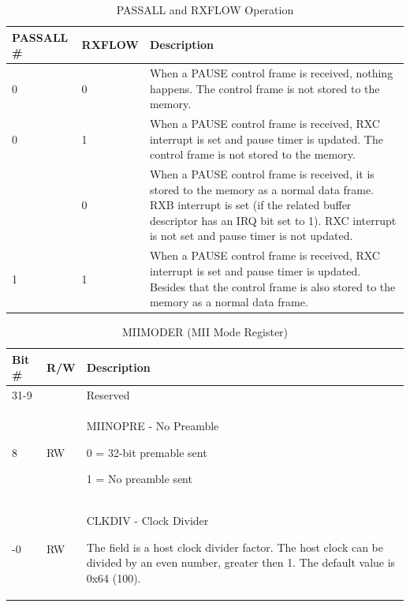 \begin{xltabular}{\textwidth}{|l|l|X|}
  
  \hline
  {\bf PASSALL \#} & {\bf RXFLOW} & {\bf Description} \\ \hline
  \endfirsthead
  \hline
  \caption{PASSALL and RXFLOW Operation}
  \endlastfoot

  0   & 0 &   When a PAUSE control frame is received, nothing happens. The
              control frame is not stored to the memory.\\* \nobreakhline
  0   & 1 &   When a PAUSE control frame is received, RXC interrupt is set
              and pause timer is updated. The control frame is not stored to
              the memory.\\*    & 0 &   When a PAUSE control frame is received, it is stored to the
              memory as a normal data frame. RXB interrupt is set (if the
              related buffer descriptor has an IRQ bit set to 1). RXC
              interrupt is not set and pause timer is not updated.\\* \nobreakhline
  1   & 1 &   When a PAUSE control frame is received, RXC interrupt is set
              and pause timer is updated. Besides that the control frame is
              also stored to the memory as a normal data frame.\\ \hline
\end{xltabular}
\label{csr_details:passall_rxflow}

\begin{xltabular}{\textwidth}{|l|l|X|}
  
  \hline
  {\bf Bit \#} & {\bf R/W} & {\bf Description} \\ \hline \hline
  \endfirsthead
  \hline
  \caption{MIIMODER (MII Mode Register)}
  \endlastfoot

  31-9   &   & Reserved \\* \nobreakhline
  8      & RW & MIINOPRE - No Preamble

              0 = 32-bit premable sent

              1 = No preamble sent\\* -0      & RW &   CLKDIV - Clock Divider

              The field is a host clock divider factor. The host clock can be
              divided by an even number, greater then 1. The default value is
              0x64 (100).\\
\end{xltabular}
\label{csr_details:miimoder}


